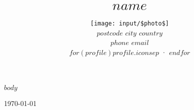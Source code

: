 \documentclass[a4paper]{article}
\title{\Large{\textsc{$name$}}\vspace{-.3cm}}
\author{
	\texttt{[image: input/\$photo\$]}\vspace{.3cm} \\
	$postcode$ \textbar{} $city$ \textbar{} $country$ \\
	$phone$ \textbar{} $email$ \vspace{0.3cm} \\
	\large{$for(profile)$\href{$profile.url$}{$profile.icon$}$sep$ · $endfor$}
}
\date{} %
\begin{document}
\maketitle
\vspace{-1cm}

$body$

\begin{flushright}
\vspace{2\baselineskip}
\noindent \today
\end{flushright}
\end{document}

